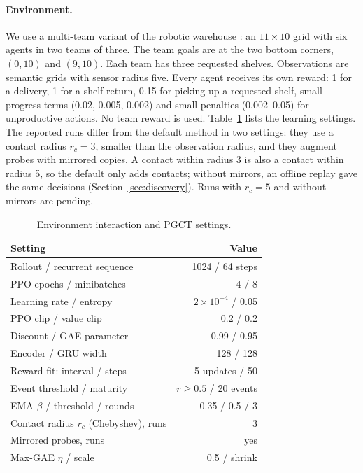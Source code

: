 \documentclass{article}
\begin{document}
\paragraph{Environment.} We use a multi-team variant of the robotic warehouse \cite{benchmark}: an $11\times10$ grid with six agents in two teams of three. The team goals are at the two bottom corners, $(0,10)$ and $(9,10)$. Each team has three requested shelves. Observations are semantic grids with sensor radius five. Every agent receives its own reward: 1 for a delivery, 1 for a shelf return, 0.15 for picking up a requested shelf, small progress terms (0.02, 0.005, 0.002) and small penalties (0.002--0.05) for unproductive actions. No team reward is used. Table~\ref{tab:settings} lists the learning settings. The reported runs differ from the default method in two settings: they use a contact radius $r_c=3$, smaller than the observation radius, and they augment probes with mirrored copies. A contact within radius 3 is also a contact within radius 5, so the default only adds contacts; without mirrors, an offline replay gave the same decisions (Section~\ref{sec:discovery}). Runs with $r_c=5$ and without mirrors are pending.

\begin{table}[t]\centering\small
\begin{tabular}{lr}\toprule
Setting & Value\\\midrule
Rollout / recurrent sequence & 1024 / 64 steps\\
PPO epochs / minibatches & 4 / 8\\
Learning rate / entropy & $2\times10^{-4}$ / 0.05\\
PPO clip / value clip & 0.2 / 0.2\\
Discount / GAE parameter & 0.99 / 0.95\\
Encoder / GRU width & 128 / 128\\
Reward fit: interval / steps & 5 updates / 50\\
Event threshold / maturity & $r\ge0.5$ / 20 events\\
EMA $\beta$ / threshold / rounds & 0.35 / 0.5 / 3\\
Contact radius $r_c$ (Chebyshev), runs & 3\\
Mirrored probes, runs & yes\\
Max-GAE $\eta$ / scale & 0.5 / shrink\\\bottomrule
\end{tabular}
\caption{Environment interaction and PGCT settings.}\label{tab:settings}
\end{table}
\end{document}
